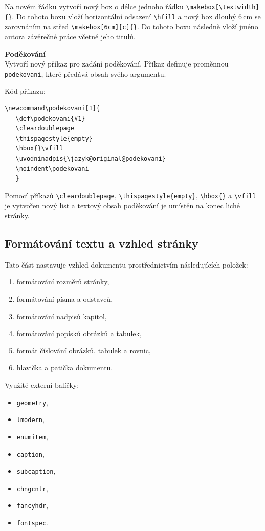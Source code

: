 Na novém řádku vytvoří nový box o délce jednoho řádku \verb|\makebox[\textwidth]{}|. Do tohoto boxu vloží horizontální odsazení \verb|\hfill| a nový box dlouhý 6\,cm se zarovnáním na střed \verb|\makebox[6cm][c]{}|. Do tohoto boxu následně vloží jméno autora závěrečné práce včetně jeho titulů.

\vspace{8pt}
\textbf{Poděkování}\\
Vytvoří nový příkaz pro zadání poděkování. Příkaz definuje proměnnou \verb|podekovani|, které předává obsah svého argumentu.

\newpage
Kód příkazu:

\begin{verbatim}
\newcommand\podekovani[1]{
   \def\podekovani{#1}
   \cleardoublepage
   \thispagestyle{empty}
   \hbox{}\vfill
   \uvodninadpis{\jazyk@original@podekovani}
   \noindent\podekovani
   }
\end{verbatim}

Pomocí příkazů \verb|\cleardoublepage|, \verb|\thispagestyle{empty}|, \verb|\hbox{}| a \verb|\vfill| je vytvořen nový list a textový obsah poděkování je umístěn na konec liché stránky.



\subsection{Formátování textu a vzhled stránky}
\label{sec:formatovani}
Tato část nastavuje vzhled dokumentu prostřednictvím následujících položek:

\begin{enumerate}
	\item formátování rozměrů stránky,
	\item formátování písma a odstavců,
	\item formátování nadpisů kapitol,
	\item formátování popisků obrázků a tabulek,
	\item formát číslování obrázků, tabulek a rovnic,
	\item hlavička a patička dokumentu.
\end{enumerate}

Využité externí balíčky:

\begin{multicols}{2}
	\begin{itemize}[label=-]
		\item \verb|geometry|,
		\item \verb|lmodern|,
		\item \verb|enumitem|,
		\item \verb|caption|,
	\columnbreak
		\item \verb|subcaption|,
		\item \verb|chngcntr|,
		\item \verb|fancyhdr|,
		\item \verb|fontspec|.
	\end{itemize}
\end{multicols}

